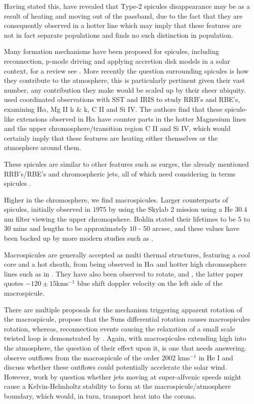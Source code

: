 \documentclass{emulateapj}
\begin{document}
Having stated this, \cite{Pereira2014} have revealed that Type-2 spicules disappearance may be as a result of heating and moving out of the passband, due to the fact that they are consequently observed in a hotter line which may imply that these features are not in fact separate populations and \cite{Zhang2012} finds no such distinction in population.

Many formation mechanisms have been proposed for spicules, including reconnection, p-mode driving and applying accretion disk models in a solar context, for a review see \cite{Sterling2000}.
More recently the question surrounding spicules is how they contribute to the atmosphere, this is particularly pertinent given their vast number, any contribution they make would be scaled up by their sheer ubiquity.
\cite{Rouppe2015} used coordinated observations with SST and IRIS to study RRB's and RBE's, examining H$\alpha$, Mg II h \& k, C II and Si IV.
The authors find that these spicule-like extensions observed in H$\alpha$ have counter parts in the hotter Magnesium lines and the upper chromosphere/transition region C II and Si IV, which would certainly imply that these features are heating either themselves or the atmosphere around them.

These spicules are similar to other features such as surges, the already mentioned RRB's/RBE's and chromospheric jets, all of which need considering in terms spicules \citep{Tsiropoula2012}.


Higher in the chromosphere, we find macrospicules. 
Larger counterparts of spicules, initially observed in $1975$ by \cite{Bohlin1975} using the Skylab 2 mission using a He $30.4$ nm filter viewing the upper chromopshere.
Bohlin stated their lifetimes to be $5$ to $30$ mins and lengths to be approximately $10$ - $50$ arcsec, and these values have been backed up by more modern studies such as \cite{Bennett2015}.

Macrospicules are generally accepted as multi thermal structures, featuring a cool core and a hot sheath, from being observed in H$\alpha$ \citep{LaBonte79} and hotter high chromosphere lines such as in \cite{Parenti2002}.
They have also been observed to rotate, \cite{Pike_Mason1998} and \cite{Kamio2010}, the latter paper quotes $-120 \pm 15$kms$^{-1}$ blue shift doppler velocity on the left side of the macrospicule. 

There are multiple proposals for the mechanism triggering apparent rotation of the macrospicule, \cite{Curdt2011} propose that the Suns differential rotation causes macrospicules rotation, whereas, reconnection events causing the relaxation of a small scale twisted loop is demonstrated by \cite{Adams2014}.
Again, with macrospicules extending high into the atmosphere, the question of their effect upon it, is one that needs answering.
\cite{Pike_Harrison1997} observe outflows from the macrospicule of the order $2002$ kms$^{-1}$ in He I and discuss whether these outflows could potentially accelerate the solar wind.
However, work by \cite{Zaqarashvili2014} question whether jets moving at super-alfvenic speeds might cause a Kelvin-Helmholtz stability to form at the macrospicule/atmosphere boundary, which would, in turn, transport heat into the corona.
\end{document}
